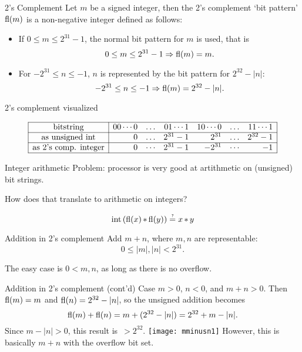 \begin{numberedframe}{2's Complement}
  Let $m$ be a signed integer, then the 2's complement `bit pattern'
  $\mathop{\mathrm{fl}}(m)$ is a non-negative integer defined as follows:
  \begin{itemize}
  \item If $0\leq m\leq 2^{31}-1$, the normal bit pattern for $m$ is
    used, that is
    \[ 0\leq m\leq 2^{31}-1 \Rightarrow \mathop{\mathrm{fl}}(m) = m. \]
  \item For $-2^{31}\leq n\leq -1$, $n$ is represented by the bit
    pattern for $2^{32}-|n|$:
    \[ -2^{31}\leq n\leq -1 \Rightarrow \mathop{\mathrm{fl}}(m) = 2^{32}-|n|. \]
  \end{itemize}
\end{numberedframe}

\begin{numberedframe}{2's complement visualized}

  \[
  \begin{array}{|c|rrrrrr|}
    \hline
    \hbox{bitstring}&
    00\cdots0&\ldots&01\cdots1&
    10\cdots0&\ldots&11\cdots1\\ \hline
    \hbox{as unsigned int}&
    0&\ldots&2^{31}-1&
    2^{31}&\ldots&2^{32}-1\\ \hline
    \hbox{as 2's comp. integer}&
    0&\cdots&2^{31}-1&
    -2^{31}&\cdots&-1\\
    \hline
  \end{array}
  \]
\end{numberedframe}

\begin{numberedframe}{Integer arithmetic}
  Problem: processor is very good at artithmetic on (unsigned) bit strings.

  How does that translate to arithmetic on integers?

  \[ \intr\left( \repr(x) \mathop{*} \repr(y) \right)
        \mathrel{\overset{\makebox[0pt]{\mbox{\normalfont\tiny\sffamily ?}}}{=}}
      x \mathop{*} y
  \]

\end{numberedframe}

\begin{numberedframe}{Addition in 2's complement}
Add $m+n$, where $m,n$ are representable:
\[ 0\leq |m|,|n|<2^{31}. \]

 The easy case is $0<m,n$, as long as there is no overflow.
\end{numberedframe}

\begin{numberedframe}{Addition in 2's complement (cont'd)}
 Case $m>0$, $n<0$, and $m+n>0$. 
  Then $\mathop{\mathrm{fl}}(m)=m$ and
  $\mathop{\mathrm{fl}}(n)=2^{32}-|n|$, so the unsigned addition becomes
  \[ \mathop{\mathrm{fl}}(m)+\mathop{\mathrm{fl}}(n)=m+(2^{32}-|n|)=2^{32}+m-|n|. \]
  Since $m-|n|>0$, this result is~$>2^{32}$.
  \texttt{[image: mminusn1]}
  However, this is basically $m+n$ with the overflow bit set.
\end{numberedframe}

